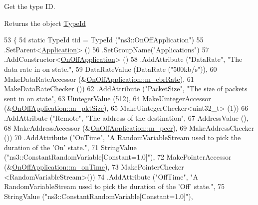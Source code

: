 Get the type ID. 

\begin{DoxyReturn}{Returns}
the object \hyperlink{classns3_1_1TypeId}{Type\+Id} 
\end{DoxyReturn}

\begin{DoxyCode}
53 \{
54   \textcolor{keyword}{static} TypeId tid = TypeId (\textcolor{stringliteral}{"ns3::OnOffApplication"})
55     .SetParent<\hyperlink{classns3_1_1Application_acd261926c72b02cdb48fc7f8838ee173}{Application}> ()
56     .SetGroupName(\textcolor{stringliteral}{"Applications"})
57     .AddConstructor<\hyperlink{classns3_1_1OnOffApplication_a9f198293aa71120515c19a0776af46d9}{OnOffApplication}> ()
58     .AddAttribute (\textcolor{stringliteral}{"DataRate"}, \textcolor{stringliteral}{"The data rate in on state."},
59                    DataRateValue (DataRate (\textcolor{stringliteral}{"500kb/s"})),
60                    MakeDataRateAccessor (&\hyperlink{classns3_1_1OnOffApplication_ae81a8be6c1ce4bef91e89cc2c44e5bcf}{OnOffApplication::m\_cbrRate}),
61                    MakeDataRateChecker ())
62     .AddAttribute (\textcolor{stringliteral}{"PacketSize"}, \textcolor{stringliteral}{"The size of packets sent in on state"},
63                    UintegerValue (512),
64                    MakeUintegerAccessor (&\hyperlink{classns3_1_1OnOffApplication_a245613852fed52486699a56f0a4984e6}{OnOffApplication::m\_pktSize}),
65                    MakeUintegerChecker<uint32\_t> (1))
66     .AddAttribute (\textcolor{stringliteral}{"Remote"}, \textcolor{stringliteral}{"The address of the destination"},
67                    AddressValue (),
68                    MakeAddressAccessor (&\hyperlink{classns3_1_1OnOffApplication_af68738cdff7818215c8e4cb0f8e5c9e9}{OnOffApplication::m\_peer}),
69                    MakeAddressChecker ())
70     .AddAttribute (\textcolor{stringliteral}{"OnTime"}, \textcolor{stringliteral}{"A RandomVariableStream used to pick the duration of the 'On' state."},
71                    StringValue (\textcolor{stringliteral}{"ns3::ConstantRandomVariable[Constant=1.0]"}),
72                    MakePointerAccessor (&\hyperlink{classns3_1_1OnOffApplication_ad09b299b329d726d30071006bf0496e8}{OnOffApplication::m\_onTime}),
73                    MakePointerChecker <RandomVariableStream>())
74     .AddAttribute (\textcolor{stringliteral}{"OffTime"}, \textcolor{stringliteral}{"A RandomVariableStream used to pick the duration of the 'Off' state."},
75                    StringValue (\textcolor{stringliteral}{"ns3::ConstantRandomVariable[Constant=1.0]"}),

\end{DoxyCode}
